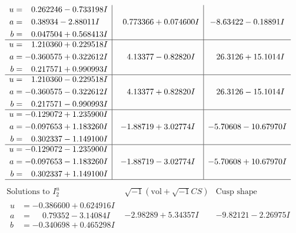 \documentclass[1p]{elsarticle_modified}
\theoremstyle{definition}
\newcommand{\I}{\sqrt{-1}}
\begin{document}
$$\begin{array}{c|c|c}
\begin{aligned}
u &= \phantom{-}0.262246 - 0.733198 I \\
a &= \phantom{-}0.38934 - 2.88011 I \\
b &= \phantom{-}0.047504 + 0.568413 I\end{aligned}
 & \phantom{-}0.773366 + 0.074600 I & -8.63422 - 0.18891 I \\ \hline\begin{aligned}
u &= \phantom{-}1.210360 + 0.229518 I \\
a &= -0.360575 + 0.322612 I \\
b &= \phantom{-}0.217571 + 0.990993 I\end{aligned}
 & \phantom{-}4.13377 - 0.82820 I & \phantom{-}26.3126 + 15.1014 I \\ \hline\begin{aligned}
u &= \phantom{-}1.210360 - 0.229518 I \\
a &= -0.360575 - 0.322612 I \\
b &= \phantom{-}0.217571 - 0.990993 I\end{aligned}
 & \phantom{-}4.13377 + 0.82820 I & \phantom{-}26.3126 - 15.1014 I \\ \hline\begin{aligned}
u &= -0.129072 + 1.235900 I \\
a &= -0.097653 + 1.183260 I \\
b &= \phantom{-}0.302337 - 1.149100 I\end{aligned}
 & -1.88719 + 3.02774 I & -5.70608 - 10.67970 I \\ \hline\begin{aligned}
u &= -0.129072 - 1.235900 I \\
a &= -0.097653 - 1.183260 I \\
b &= \phantom{-}0.302337 + 1.149100 I\end{aligned}
 & -1.88719 - 3.02774 I & -5.70608 + 10.67970 I\\
 \hline 
 \end{array}$$\newpage$$\begin{array}{c|c|c}  
\text{Solutions to }I^u_{2}& \I (\text{vol} + \sqrt{-1}CS) & \text{Cusp shape}\\
 \hline 
\begin{aligned}
u &= -0.386600 + 0.624916 I \\
a &= \phantom{-}0.79352 - 3.14084 I \\
b &= -0.340698 + 0.465298 I\end{aligned}
 & -2.98289 + 5.34357 I & -9.82121 - 2.26975 I \\ \hline\begin{aligned}

\end{aligned}
\end{array}$$
\end{document}
